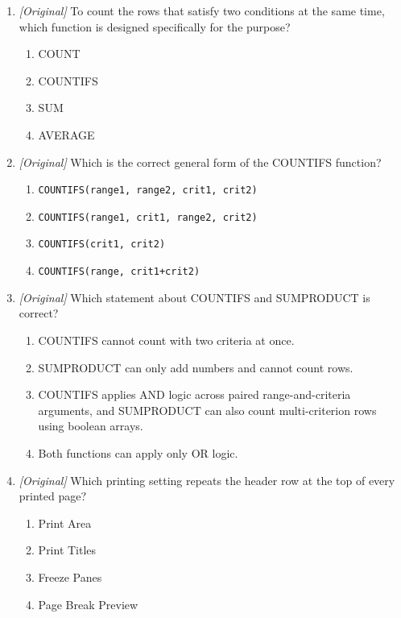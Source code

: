 \begin{enumerate}[label=\textbf{Q\arabic*.}, leftmargin=*]
\begin{enumerate}[label=\Alph*.]
    \item II and III only
    \item I, II, and III
  \end{enumerate}
\item \textit{[Original]} To count the rows that satisfy two conditions at the
  same time, which function is designed specifically for the purpose?
  \begin{enumerate}[label=\Alph*.]
    \item COUNT
    \item COUNTIFS
    \item SUM
    \item AVERAGE
  \end{enumerate}
\item \textit{[Original]} Which is the correct general form of the COUNTIFS
  function?
  \begin{enumerate}[label=\Alph*.]
    \item \texttt{COUNTIFS(range1, range2, crit1, crit2)}
    \item \texttt{COUNTIFS(range1, crit1, range2, crit2)}
    \item \texttt{COUNTIFS(crit1, crit2)}
    \item \texttt{COUNTIFS(range, crit1+crit2)}
  \end{enumerate}
\item \textit{[Original]} Which statement about COUNTIFS and SUMPRODUCT is
  correct?
  \begin{enumerate}[label=\Alph*.]
    \item COUNTIFS cannot count with two criteria at once.
    \item SUMPRODUCT can only add numbers and cannot count rows.
    \item COUNTIFS applies AND logic across paired range-and-criteria
      arguments, and SUMPRODUCT can also count multi-criterion rows using
      boolean arrays.
    \item Both functions can apply only OR logic.
  \end{enumerate}
\item \textit{[Original]} Which printing setting repeats the header row at the
  top of every printed page?
  \begin{enumerate}[label=\Alph*.]
    \item Print Area
    \item Print Titles
    \item Freeze Panes
    \item Page Break Preview

\end{enumerate}
\end{enumerate}

